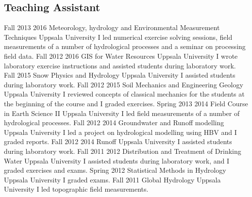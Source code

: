     \subsection{Teaching Assistant}
        \position
            {Fall 2013 \textemdash{} 2016}
            {Meteorology, hydrology and Environmental Measurement Techniques}
            {Uppsala University}
            {I led numerical exercise solving sessions, field measurements of a number of hydrological processes and a seminar on processing field data.}
        \position
            {Fall 2012 \textemdash{} 2016}
            {GIS for Water Resources}
            {Uppsala University}
            {I wrote laboratory exercise instructions and assisted students during laboratory work.}
        \position
            {Fall 2015}
            {Snow Physics and Hydrology}
            {Uppsala University}
            {I assisted students during laboratory work.}
        \position
            {Fall 2012 \textemdash{} 2015}
            {Soil Mechanics and Engineering Geology}
            {Uppsala University}
            {I reviewed concepts of classical mechanics for the students at the beginning of the course and I graded exercises.}
        \position
            {Spring 2013 \textemdash{} 2014}
            {Field Course in Earth Science II}
            {Uppsala University}
            {I led field measurements of a number of hydrological processes.}
        \position
            {Fall 2012 \textemdash{} 2014}
            {Groundwater and Runoff modelling}
            {Uppsala University}
            {I led a project on hydrological modelling using HBV and I graded reports.}
        \position
            {Fall 2012 \textemdash{} 2014}
            {Runoff}
            {Uppsala University}
            {I assisted students during laboratory work.}
        \position
            {Fall 2011 \textemdash{} 2012}
            {Distribution and Treatment of Drinking Water}
            {Uppsala University}
            {I assisted students during laboratory work, and I graded exercises and exams.}
        \position
            {Spring 2012}
            {Statistical Methods in Hydrology}
            {Uppsala University}
            {I graded exams.}
        \position
            {Fall 2011}
            {Global Hydrology}
            {Uppsala University}
            {I led topographic field measurements.}